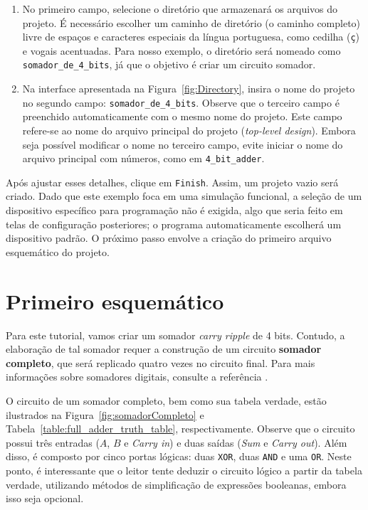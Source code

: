 \documentclass[12pt,a4paper]{article}
\begin{document}
\begin{enumerate}
    \item No primeiro campo, selecione o diretório que armazenará os arquivos do projeto. É necessário escolher um caminho de diretório (o caminho completo) livre de espaços e caracteres especiais da língua portuguesa, como cedilha (\texttt{\c{c}}) e vogais acentuadas. Para nosso exemplo, o diretório será nomeado como \texttt{somador\_de\_4\_bits}, já que o objetivo é criar um circuito somador.
    
    \item Na interface apresentada na Figura~\ref{fig:Directory}, insira o nome do projeto no segundo campo: \texttt{somador\_de\_4\_bits}. Observe que o terceiro campo é preenchido automaticamente com o mesmo nome do projeto. Este campo refere-se ao nome do arquivo principal do projeto (\textit{top-level design}). Embora seja possível modificar o nome no terceiro campo, evite iniciar o nome do arquivo principal com números, como em \texttt{4\_bit\_adder}. 
\end{enumerate}

Após ajustar esses detalhes, clique em \texttt{Finish}. Assim, um projeto vazio será criado. Dado que este exemplo foca em uma simulação funcional, a seleção de um dispositivo específico para programação não é exigida, algo que seria feito em telas de configuração posteriores; o programa automaticamente escolherá um dispositivo padrão. O próximo passo envolve a criação do primeiro arquivo esquemático do projeto.

\section{Primeiro esquemático}

Para este tutorial, vamos criar um somador \textit{carry ripple} de 4 bits. Contudo, a elaboração de tal somador requer a construção de um circuito \textbf{somador completo}, que será replicado quatro vezes no circuito final. Para mais informações sobre somadores digitais, consulte a referência \cite{Tocci2007SistemasDigitais}. 

O circuito de um somador completo, bem como sua tabela verdade, estão ilustrados na Figura~\ref{fig:somadorCompleto} e Tabela~\ref{table:full_adder_truth_table}, respectivamente. Observe que o circuito possui três entradas ($A$, $B$ e \textit{Carry in}) e duas saídas (\textit{Sum} e \textit{Carry out}). Além disso, é composto por cinco portas lógicas: duas \texttt{XOR}, duas \texttt{AND} e uma \texttt{OR}. Neste ponto, é interessante que o leitor tente deduzir o circuito lógico a partir da tabela verdade, utilizando métodos de simplificação de expressões booleanas, embora isso seja opcional.
\end{document}
